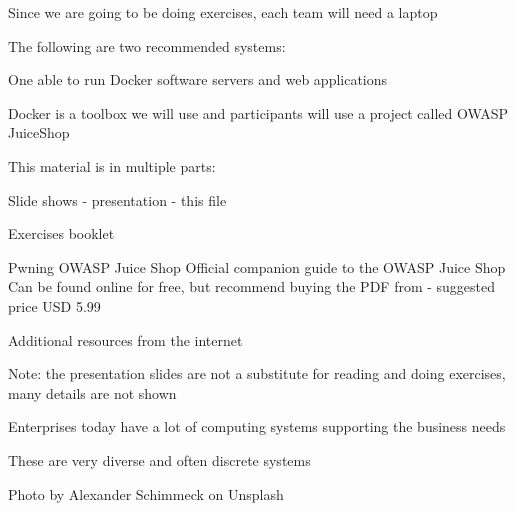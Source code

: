 \documentclass[Screen16to9,17pt]{foils}
\begin{document}


Since we are going to be doing exercises, each team will need a laptop

The following are two recommended systems:
\begin{list2}
\item One able to run Docker software servers and web applications
\end{list2}

Docker is a toolbox we will use and participants will use a project called OWASP JuiceShop




\begin{list1}
\item This material is in multiple parts:
\begin{list2}
\item Slide shows - presentation - this file
\item Exercises booklet
\item Pwning OWASP Juice Shop Official companion guide to the OWASP Juice Shop
Can be found online for free, but recommend buying the PDF from  - suggested price USD 5.99

\end{list2}
\item Additional resources from the internet
\item Note: the presentation slides are not a substitute for reading and doing exercises, many details are not shown
\end{list1}





\begin{list2}
\item Enterprises today have a lot of computing systems supporting the business needs
\item These are very diverse and often discrete systems
\end{list2}

\hfill Photo by Alexander Schimmeck on Unsplash
\end{document}
